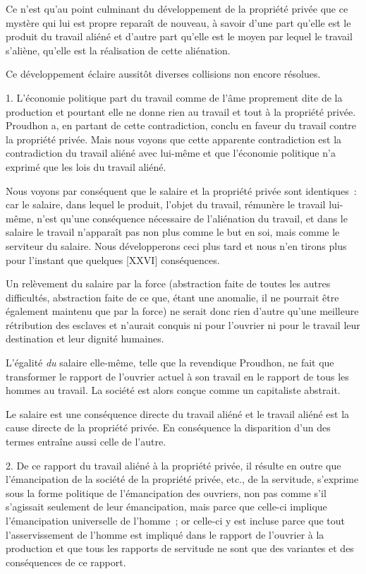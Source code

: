 \documentclass[french,twoside]{book} %
\begin{document}
Ce n’est qu’au point culminant du développement de la propriété privée que ce mystère qui lui est propre reparaît de nouveau, à savoir d’une part qu’elle est le produit du travail aliéné et d’autre part qu’elle est le moyen par lequel le travail s’aliène, qu’elle est la réalisation de cette aliénation.\par
Ce développement éclaire aussitôt diverses collisions non encore résolues.\par
1. L’économie politique part du travail comme de l’âme proprement dite de la production et pourtant elle ne donne rien au travail et tout à la propriété privée. Proudhon a, en partant de cette contradiction, conclu en faveur du travail contre la propriété privée. Mais nous voyons que cette apparente contradiction est la contradiction du travail aliéné avec lui-même et que l’économie politique n’a exprimé que les lois du travail aliéné.\par
Nous voyons par conséquent que le salaire et la propriété privée sont identiques : car le salaire, dans lequel le produit, l’objet du travail, rémunère le travail lui-même, n’est qu’une conséquence nécessaire de l’aliénation du travail, et dans le salaire le travail n’apparaît pas non plus comme le but en soi, mais comme le serviteur du salaire. Nous développerons ceci plus tard et nous n’en tirons plus pour l’instant que quelques [XXVI] conséquences.\par
Un relèvement du salaire par la force (abstraction faite de toutes les autres difficultés, abstraction faite de ce que, étant une anomalie, il ne pourrait être également maintenu que par la force) ne serait donc rien d’autre qu’une meilleure rétribution des esclaves et n’aurait conquis ni pour l’ouvrier ni pour le travail leur destination et leur dignité humaines.\par
L’égalité \emph{du} salaire elle-même, telle que la revendique Proudhon, ne fait que transformer le rapport de l’ouvrier actuel à son travail en le rapport de tous les hommes au travail. La société est alors conçue comme un capitaliste abstrait.\par
Le salaire est une conséquence directe du travail aliéné et le travail aliéné est la cause directe de la propriété privée. En conséquence la disparition d’un des termes entraîne aussi celle de l’autre.\par
2. De ce rapport du travail aliéné à la propriété privée, il résulte en outre que l’émancipation de la société de la propriété privée, etc., de la servitude, s’exprime sous la forme politique de l’émancipation des ouvriers, non pas comme s’il s’agissait seulement de leur émancipation, mais parce que celle-ci implique l’émancipation universelle de l’homme ; or celle-ci y est incluse parce que tout l’asservissement de l’homme est impliqué dans le rapport de l’ouvrier à la production et que tous les rapports de servitude ne sont que des variantes et des conséquences de ce rapport.\par
\end{document}
